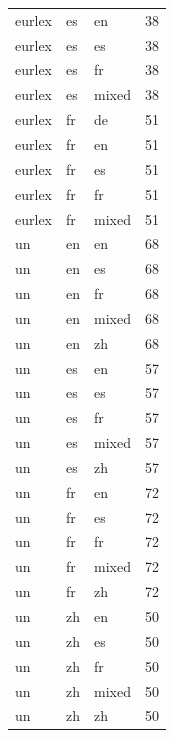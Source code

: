 \begin{tabular}{lllr}
eurlex & es & en & 38 \\
eurlex & es & es & 38 \\
eurlex & es & fr & 38 \\
eurlex & es & mixed & 38 \\
eurlex & fr & de & 51 \\
eurlex & fr & en & 51 \\
eurlex & fr & es & 51 \\
eurlex & fr & fr & 51 \\
eurlex & fr & mixed & 51 \\
un & en & en & 68 \\
un & en & es & 68 \\
un & en & fr & 68 \\
un & en & mixed & 68 \\
un & en & zh & 68 \\
un & es & en & 57 \\
un & es & es & 57 \\
un & es & fr & 57 \\
un & es & mixed & 57 \\
un & es & zh & 57 \\
un & fr & en & 72 \\
un & fr & es & 72 \\
un & fr & fr & 72 \\
un & fr & mixed & 72 \\
un & fr & zh & 72 \\
un & zh & en & 50 \\
un & zh & es & 50 \\
un & zh & fr & 50 \\
un & zh & mixed & 50 \\
un & zh & zh & 50 \\
\bottomrule
\end{tabular}
